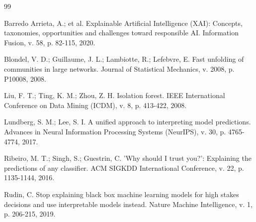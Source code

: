 \documentclass[12pt,a4paper]{article}
\begin{document}
\begin{thebibliography}{99}

 Barredo Arrieta, A.; et al. Explainable Artificial Intelligence (XAI): Concepts, taxonomies, opportunities and challenges toward responsible AI. Information Fusion, v. 58, p. 82-115, 2020.

 Blondel, V. D.; Guillaume, J. L.; Lambiotte, R.; Lefebvre, E. Fast unfolding of communities in large networks. Journal of Statistical Mechanics, v. 2008, p. P10008, 2008.

 Liu, F. T.; Ting, K. M.; Zhou, Z. H. Isolation forest. IEEE International Conference on Data Mining (ICDM), v. 8, p. 413-422, 2008.

 Lundberg, S. M.; Lee, S. I. A unified approach to interpreting model predictions. Advances in Neural Information Processing Systems (NeurIPS), v. 30, p. 4765-4774, 2017.

 Ribeiro, M. T.; Singh, S.; Guestrin, C. 'Why should I trust you?': Explaining the predictions of any classifier. ACM SIGKDD International Conference, v. 22, p. 1135-1144, 2016.

 Rudin, C. Stop explaining black box machine learning models for high stakes decisions and use interpretable models instead. Nature Machine Intelligence, v. 1, p. 206-215, 2019.

\end{thebibliography}
\end{document}
